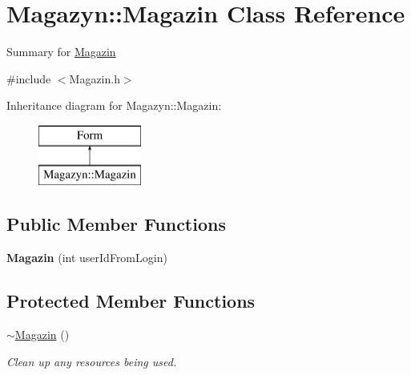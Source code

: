 \hypertarget{class_magazyn_1_1_magazin}{}\section{Magazyn\+:\+:Magazin Class Reference}
\label{class_magazyn_1_1_magazin}


Summary for \hyperlink{class_magazyn_1_1_magazin}{Magazin}  




{\ttfamily \#include $<$Magazin.\+h$>$}

Inheritance diagram for Magazyn\+:\+:Magazin\+:\begin{figure}[H]
\begin{center}
\leavevmode
\includegraphics[height=2.000000cm]{class_magazyn_1_1_magazin}
\end{center}
\end{figure}
\subsection*{Public Member Functions}
\begin{DoxyCompactItemize}
\item 
\hypertarget{class_magazyn_1_1_magazin_aa115a58816655e83d9a067d8c840a3e9}{}\label{class_magazyn_1_1_magazin_aa115a58816655e83d9a067d8c840a3e9} 
{\bfseries Magazin} (int user\+Id\+From\+Login)
\end{DoxyCompactItemize}
\subsection*{Protected Member Functions}
\begin{DoxyCompactItemize}
\item 
\hyperlink{class_magazyn_1_1_magazin_a3d5a3139a7bce989a8cff474eaa311d6}{$\sim$\+Magazin} ()
\begin{DoxyCompactList}\small\item\em Clean up any resources being used. \end{DoxyCompactList}\end{DoxyCompactItemize}
